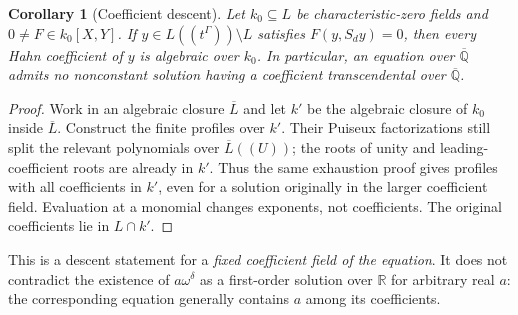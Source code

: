 \documentclass[11pt,letterpaper]{article}
\numberwithin{equation}{section}
\newtheorem{corollary}[corollary]{Corollary}
\theoremstyle{definition}
\theoremstyle{remark}
\newcommand{\R}{\mathbb R}
\newcommand{\Q}{\mathbb Q}
\begin{document}
\begin{corollary}[Coefficient descent]\label{adr:cor:coefficients}
Let $k_0\subseteq L$ be characteristic-zero fields and
$0\ne F\in k_0[X,Y]$. If $y\in L((t^\Gamma))\setminus L$ satisfies
$F(y,S_dy)=0$, then every Hahn coefficient of $y$ is algebraic over $k_0$.
In particular, an equation over $\overline{\Q}$ admits no nonconstant
solution having a coefficient transcendental over $\overline{\Q}$.
\end{corollary}
\begin{proof}
Work in an algebraic closure $\overline L$ and let $k'$ be the algebraic
closure of $k_0$ inside $\overline L$. Construct the finite profiles over
$k'$. Their Puiseux factorizations still split the relevant polynomials
over $\overline L((U))$; the roots of unity and leading-coefficient roots
are already in $k'$. Thus the same exhaustion proof gives profiles with
all coefficients in $k'$, even for a solution originally in the larger
coefficient field. Evaluation at a monomial changes exponents, not
coefficients. The original coefficients lie in $L\cap k'$.
\end{proof}

This is a descent statement for a \emph{fixed coefficient field of the
equation}. It does not contradict the existence of $a\omega^\delta$ as
a first-order solution over $\R$ for arbitrary real $a$: the corresponding
equation generally contains $a$ among its coefficients.
\end{document}
